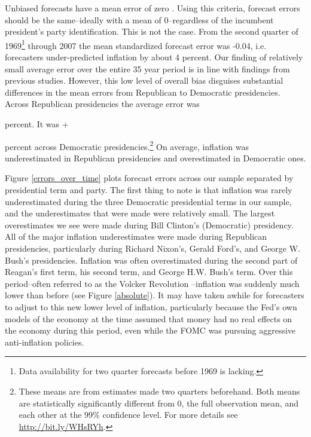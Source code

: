 \documentclass[a4paper]{article}
\begin{document}
Unbiased forecasts have a mean error of zero \citep[5]{Bruck2006}. Using this criteria, forecast errors should be the same--ideally with a mean of 0--regardless of the incumbent president's party identification. This is not the case. From the second quarter of 1969\footnote{Data availability for two quarter forecasts before 1969 is lacking.} through 2007 the mean standardized forecast error was -0.04, i.e. forecasters under-predicted inflation by about 4 percent. Our finding of relatively small average error over the entire 35 year period is in line with findings from previous studies. However, this low level of overall bias disguises substantial differences in the mean errors from Republican to Democratic presidencies. Across Republican presidencies the average error was 

{\ttfamily\noindent\bfseries\color{errorcolor}{\\Error in eval(expr, envir, enclos) : object 'RepMean' not found}} percent. It was +

{\ttfamily\noindent\bfseries\color{errorcolor}{\\Error in eval(expr, envir, enclos) : object 'DemMean' not found}} percent across Democratic presidencies.\footnote{These means are from estimates made two quarters beforehand. Both means are statistically significantly different from 0, the full observation mean, and each other at the 99\% confidence level. For more details see \url{http://bit.ly/WHsRYh}.} On average, inflation was underestimated in Republican presidencies and overestimated in Democratic ones.

Figure \ref{errors_over_time} plots forecast errors across our sample separated by presidential term and party. The first thing to note is that inflation was rarely underestimated during the three Democratic presidential terms in our sample, and the underestimates that were made were relatively small. The largest overestimates we see were made during Bill Clinton's (Democratic) presidency. All of the major inflation underestimates were made during Republican presidencies, particularly during Richard Nixon's, Gerald Ford's, and George W. Bush's presidencies. Inflation was often overestimated during the second part of Reagan's first term, his second term, and George H.W. Bush's term. Over this period--often referred to as the Volcker Revolution \citep{Bartels1985}--inflation was suddenly much lower than before (see Figure \ref{absolute}). It may have taken awhile for forecasters to adjust to this new lower level of inflation, particularly because the Fed's own models of the economy at the time assumed that money had no real effects on the economy during this period, even while the FOMC was pursuing aggressive anti-inflation policies.
\end{document}

